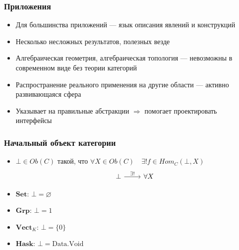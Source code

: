 \documentclass{beamer}
\begin{document}
\begin{frame}
\frametitle{Приложения}
\begin{itemize}
\item Для большинства приложений --- язык описания явлений и конструкций
\pause
\item Несколько несложных результатов, полезных везде
\pause
\item Алгебраическая геометрия, алгебраическая топология --- невозможны в современном виде без теории категорий
\pause
\item Распространение реального применения на другие области --- активно развивающаяся сфера
\pause
\item Указывает на правильные абстракции \begin{math}\Rightarrow\end{math} помогает проектировать интерфейсы
\end{itemize}
\end{frame}

\begin{frame}[fragile]
\frametitle{Начальный объект категории}
\begin{itemize}
\item \begin{math}\bot \in Ob(C)\end{math} такой, что \begin{math}\forall X \in Ob(C) \quad \exists! f \in Hom_C(\bot, X)\end{math}
\begin{equation}
\begin{tikzcd}
\bot\arrow{r}{\exists!} & \forall X
\end{tikzcd}
\end{equation}
\pause
\item \begin{math}\mathbf{Set}\end{math}: \begin{math}\bot = \varnothing\end{math}
\pause
\item \begin{math}\mathbf{Grp}\end{math}: \begin{math}\bot = 1\end{math}
\pause
\item \begin{math}\mathbf{Vect}_K\end{math}: \begin{math}\bot = \{0\}\end{math}
\pause
\item \begin{math}\mathbf{Hask}\end{math}: \begin{math}\bot = \text{Data.Void}\end{math}
\end{itemize}
\end{frame}
\end{document}
